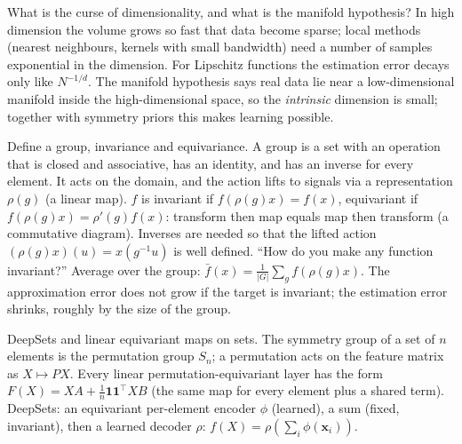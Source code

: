 \begin{qabox}{\cexam What is the curse of dimensionality, and what is the manifold hypothesis?}
\ans In high dimension the volume grows so fast that data become sparse; local methods (nearest
neighbours, kernels with small bandwidth) need a number of samples exponential in the dimension.
For Lipschitz functions the estimation error decays only like $N^{-1/d}$. The manifold hypothesis
says real data lie near a low-dimensional manifold inside the high-dimensional space, so the
\emph{intrinsic} dimension is small; together with symmetry priors this makes learning possible.
\end{qabox}

\begin{qabox}{\cexam Define a group, invariance and equivariance.}
\ans A group is a set with an operation that is closed and associative, has an identity, and has an
inverse for every element. It acts on the domain, and the action lifts to signals via a
representation $\rho(g)$ (a linear map). $f$ is invariant if $f(\rho(g)x)=f(x)$, equivariant if
$f(\rho(g)x)=\rho'(g)f(x)$: transform then map equals map then transform (a commutative diagram).
Inverses are needed so that the lifted action $(\rho(g)x)(u)=x(g^{-1}u)$ is well defined.
\follow ``How do you make any function invariant?'' Average over the group:
$\bar f(x)=\frac1{|G|}\sum_gf(\rho(g)x)$. The approximation error does not grow if the target is
invariant; the estimation error shrinks, roughly by the size of the group.
\end{qabox}

\begin{qabox}{\cexam DeepSets and linear equivariant maps on sets.}
\ans The symmetry group of a set of $n$ elements is the permutation group $S_n$; a permutation acts
on the feature matrix as $X\mapsto PX$. Every linear permutation-equivariant layer has the form
$F(X)=XA+\frac1n\mathbf{1}\mathbf{1}^\top XB$ (the same map for every element plus a shared term).
DeepSets: an equivariant per-element encoder $\phi$ (learned), a sum (fixed, invariant), then a
learned decoder $\rho$: $f(X)=\rho(\sum_i\phi(\mathbf{x}_i))$.
\end{qabox}

